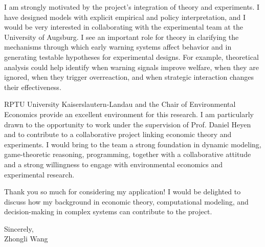 \documentclass[11pt]{article}
\begin{document}
I am strongly motivated by the project's integration of theory and experiments. I have designed models with explicit empirical and policy interpretation, and I would be very interested in collaborating with the experimental team at the University of Augsburg. I see an important role for theory in clarifying the mechanisms through which early warning systems affect behavior and in generating testable hypotheses for experimental designs. For example, theoretical analysis could help identify when warning signals improve welfare, when they are ignored, when they trigger overreaction, and when strategic interaction changes their effectiveness.

RPTU University Kaiserslautern-Landau and the Chair of Environmental Economics provide an excellent environment for this research. I am particularly drawn to the opportunity to work under the supervision of Prof. Daniel Heyen and to contribute to a collaborative project linking economic theory and experiments. I would bring to the team a strong foundation in dynamic modeling, game-theoretic reasoning, programming, together with a collaborative attitude and a strong willingness to engage with environmental economics and experimental research.

Thank you so much for considering my application! I would be delighted to discuss how my background in economic theory, computational modeling, and decision-making in complex systems can contribute to the project.

\vspace{0.35cm}

\noindent Sincerely,\\[0.95cm]
\noindent Zhongli Wang
\end{document}
